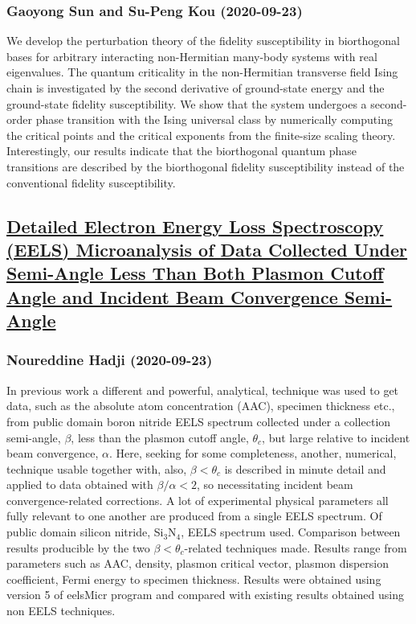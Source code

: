 \subsubsection*{Gaoyong Sun and Su-Peng Kou (2020-09-23)}
We develop the perturbation theory of the fidelity susceptibility in
biorthogonal bases for arbitrary interacting non-Hermitian many-body systems
with real eigenvalues. The quantum criticality in the non-Hermitian transverse
field Ising chain is investigated by the second derivative of ground-state
energy and the ground-state fidelity susceptibility. We show that the system
undergoes a second-order phase transition with the Ising universal class by
numerically computing the critical points and the critical exponents from the
finite-size scaling theory. Interestingly, our results indicate that the
biorthogonal quantum phase transitions are described by the biorthogonal
fidelity susceptibility instead of the conventional fidelity susceptibility.

\subsection*{\href{http://arxiv.org/abs/2009.11181v1}{Detailed Electron Energy Loss Spectroscopy (EELS) Microanalysis of Data  Collected Under Semi-Angle Less Than Both Plasmon Cutoff Angle and Incident  Beam Convergence Semi-Angle}}
\subsubsection*{Noureddine Hadji (2020-09-23)}
In previous work a different and powerful, analytical, technique was used to
get data, such as the absolute atom concentration (AAC), specimen thickness
etc., from public domain boron nitride EELS spectrum collected under a
collection semi-angle, $\beta$, less than the plasmon cutoff angle,
$\theta_{c}$, but large relative to incident beam convergence, $\alpha$. Here,
seeking for some completeness, another, numerical, technique usable together
with, also, $\beta < \theta_{c}$ is described in minute detail and applied to
data obtained with $\beta/\alpha < 2$, so necessitating incident beam
convergence-related corrections. A lot of experimental physical parameters all
fully relevant to one another are produced from a single EELS spectrum. Of
public domain silicon nitride, Si$_{3}$N$_{4}$, EELS spectrum used. Comparison
between results producible by the two $\beta<\theta_{c}$-related techniques
made. Results range from parameters such as AAC, density, plasmon critical
vector, plasmon dispersion coefficient, Fermi energy to specimen thickness.
Results were obtained using version 5 of eelsMicr program and compared with
existing results obtained using non EELS techniques.

